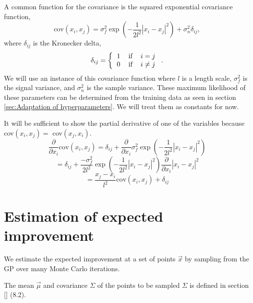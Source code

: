 \documentclass[phd,tocprelim]{cornell}
\begin{document}
A common function for the covariance is the squared exponential covariance function,
\begin{equation}
    \mbox{cov}(x_{i}, x_{j}) = \sigma_{f}^{2}\exp\left( -\frac{1}{2l^{2}} |x_{i} - x_{j}|^{2}\right)  + \sigma_{n}^{2}\delta_{ij},
\end{equation}
where $\delta_{ij}$ is the Kronecker delta,
\begin{equation}
    \delta_{ij} = \left\{ \begin{tabular}{ccc}
        1 & if & $i=j$ \\
        0 & if & $i\neq j$
    \end{tabular} \right..
\end{equation}
We will use an instance of this covariance function where $l$ is a length scale, $\sigma_{f}^{2}$ is the signal variance, and $\sigma_{n}^{2}$ is the sample variance. These maximum likelihood of these parameters can be determined from the training data as seen in section \ref{sec:Adaptation of hyperparameters}. We will treat them as constants for now.

It will be sufficient to show the partial derivative of one of the variables because cov$(x_{i}, x_{j}) = $ cov$(x_{j}, x_{i})$.
\begin{equation}
    \frac{\partial}{\partial x_{i}} \mbox{cov}(x_{i}, x_{j}) = \delta_{ij} + \frac{\partial}{\partial x_{i}} \sigma_{f}^{2} \exp\left( - \frac{1}{2l^{2}} |x_{i} - x_{j}|^{2}\right)
\end{equation}
\begin{equation}
    =  \delta_{ij} + \frac{-\sigma_{f}^{2}}{2l^{2}} \exp\left( - \frac{1}{2l^{2}} |x_{i} - x_{j}|^{2}\right) \frac{\partial}{\partial x_{i}} |x_{i} - x_{j}|^{2}
\end{equation}
\begin{equation}
    =  \frac{x_{j} - x_{i}}{l^{2}} \mbox{cov}(x_{i}, x_{j}) + \delta_{ij}
\end{equation}

\section{Estimation of expected improvement}
\label{estEI}

We estimate the expected improvement at a set of points $\vec{x}$ by sampling from the GP over many Monte Carlo iterations.

The mean $\vec{\mu}$ and covariance $\Sigma$ of the points to be sampled $\Sigma$ is defined in section \ref{} (8.2).
\end{document}
